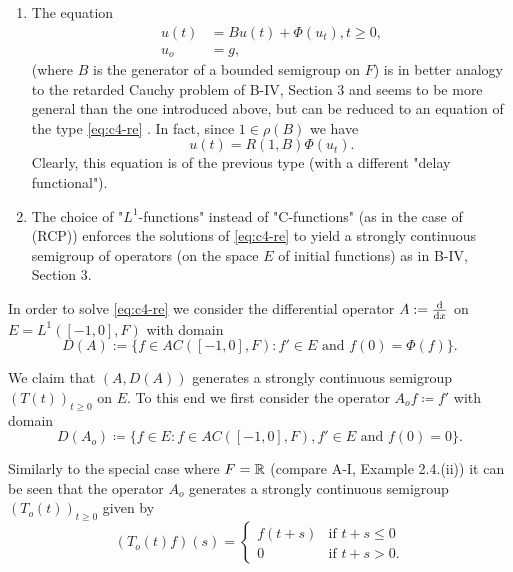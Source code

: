 \begin{remarks*}
\begin{enumerate}[(1)]
\item \label{rem:c4-kgk-1}
The equation
\begin{align*}
u(t) &= Bu(t) + \Phi(u_t), t \geq 0,\\
u_o &= g,
\end{align*}
(where $B$ is the generator of a bounded semigroup on $F$) is in better analogy to the retarded Cauchy problem of B-IV, Section 3 and seems to be more general than the one introduced above, but can be reduced to an equation of the type \eqref{eq:c4-re} .
In fact, since $1 \in \rho(B)$ we have
\begin{equation*}\label{eq:c4-3.0-KGK1}
u(t) = R(1,B)\Phi(u_{t}).
\end{equation*}
Clearly, this equation is of the previous type (with a different "delay functional").
\item \label{rem:c4-kgk-2}
The choice of "$L^{1}$-functions" instead of "C-functions" (as in the case of (RCP)) enforces the solutions of \eqref{eq:c4-re} to yield a strongly continuous semigroup of operators (on the space $E$ of initial functions) as in B-IV, Section 3.
\end{enumerate}
\end{remarks*}

In order to solve \eqref{eq:c4-re} we consider the differential operator $A := \frac{\mathop{}\!\mathrm{d}{}}{\mathop{}\!\mathrm{d}{x}}$ on $E = L^{1}([-1,0],F)$ with domain
\begin{equation*}\label{eq:c4-3.0-KGK2}
D(A):=\{f \in AC([-1,0],F) : f' \in E \text{ and } f(0) = \Phi(f)\}.
\end{equation*}

We claim that $(A,D(A))$ generates a strongly continuous semigroup $(T(t))_{t\geq 0}$ on $E$.
To this end we first consider the operator $A_o f \coloneqq f'$ with domain
\begin{equation*}\label{eq:c4-3.0-KGK3}
D(A_o) \coloneqq \{f \in E : f \in AC([-1,0],F), f' \in E \text{ and } f(0) = 0\}.
\end{equation*}

Similarly to the special case where $F = \mathbb{R}$ (compare A-I, Example 2.4.(ii)) it can be seen that the operator $A_o$ generates a strongly continuous semigroup $(T_o(t))_{t\geq 0}$ given by
\begin{equation}\label{eq:c4-3.1}
(T_o(t)f)(s) = \begin{cases}
    f(t+s) & \text{if } t+s \leq 0 \\
    0 & \text{if } t+s > 0.
\end{cases}
\end{equation}

